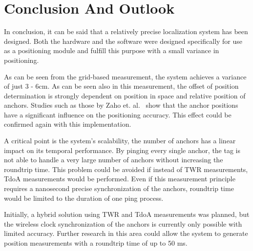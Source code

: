 \documentclass[final, conference, a4paper]{IEEEtran}
\begin{document}

\section{Conclusion And Outlook}\label{section:conclusion}
In conclusion, it can be said that a relatively precise localization system has been designed.
Both the hardware and the software were designed specifically for use as a positioning module
and fulfill this purpose with a small variance in positioning.

As can be seen from the grid-based measurement, the system achieves a variance of just 3 - 6cm.
As can be seen also in this measurement,
the offset of position determination is strongly dependent on position in space
and relative position of anchors.
Studies such as those by Zaho et. al.~\cite{Zhao_2022} show that the anchor positions
have a significant influence on the positioning accuracy.
This effect could be confirmed again with this implementation.

A critical point is the system's scalability, the number of anchors has a linear impact on its temporal performance.
By pinging every single anchor, the tag is not able to handle a very large number of anchors without increasing the roundtrip time.
This problem could be avoided if instead of \ac{TWR} measurements, \ac{TdoA} measurements would be performed.
Even if this measurement principle requires a nanosecond precise synchronization of the anchors,
roundtrip time would be limited to the duration of one ping process.

Initially, a hybrid solution using \ac{TWR} and \ac{TdoA} measurements was planned,
but the wireless clock synchronization of the anchors is currently only possible with limited accuracy.
Further research in this area could allow the system to generate position measurements with a roundtrip time of up to 50 ms.




 
\end{document}

